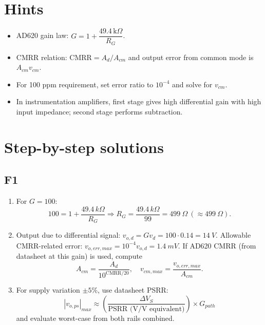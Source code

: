 \documentclass[12pt,a4paper]{article}
\begin{document}
\section{Hints}
\begin{itemize}
\item AD620 gain law: $G=1+\dfrac{49.4\,\text{k}\Omega}{R_G}$.
\item CMRR relation: $\text{CMRR}=A_d/A_{cm}$ and output error from common mode is $A_{cm}v_{cm}$.
\item For 100 ppm requirement, set error ratio to $10^{-4}$ and solve for $v_{cm}$.
\item In instrumentation amplifiers, first stage gives high differential gain with high input impedance; second stage performs subtraction.
\end{itemize}

\section{Step-by-step solutions}
\subsection{F1}
\begin{enumerate}
\item For $G=100$:
\[
100=1+\frac{49.4\,k\Omega}{R_G}
\Rightarrow
R_G=\frac{49.4\,k\Omega}{99}=\SI{499}{\Omega}\ (\approx\SI{499}{\Omega}).
\]
\item Output due to differential signal: $v_{o,d}=Gv_d=100\cdot0.14=\SI{14}{V}$.
Allowable CMRR-related error: $v_{o,err,max}=10^{-4}v_{o,d}=\SI{1.4}{mV}$.
If AD620 CMRR (from datasheet at this gain) is used, compute 
\[
A_{cm}=\frac{A_d}{10^{\text{CMRR}/20}},\quad v_{cm,max}=\frac{v_{o,err,max}}{A_{cm}}.
\]
\item For supply variation \(\pm5\%\), use datasheet PSRR:
\[
|v_{o,ps}|_{max}\approx \left(\frac{\Delta V_S}{\text{PSRR (V/V equivalent)}}\right)\times G_{path}
\]
and evaluate worst-case from both rails combined.
\end{enumerate}
\end{document}
